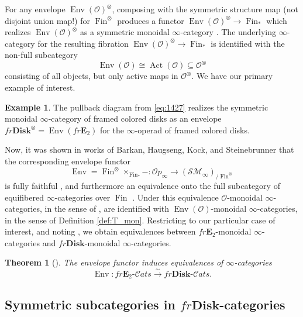 \documentclass[reqno]{amsart}
\newtheorem{theorem}[lemma]{Theorem}
\theoremstyle{definition}
\newtheorem{example}[lemma]{Example}
\newcommand{\msc}[1]{\mathscr{#1}}
\newcommand{\opn}[1]{\operatorname{#1}}
\newcommand{\ot}{\otimes}
\newcommand{\E}{\mathbf{E}}
\newcommand{\Disk}{\mathbf{Disk}}
\newcommand{\SM}{\mathscr{S}\!\!\mathscr{M}}
\DeclareMathOperator{\Fin}{Fin}
\renewcommand{\1}{\mathbf{1}}
\begin{document}
For any envelope $\opn{Env}(\msc{O})^{\ot}$, composing with the symmetric structure map (not disjoint union map!) for $\Fin^{\ot}$ produces a functor $\opn{Env}(\msc{O})^{\ot}\to \Fin_{\ast}$ which realizes $\opn{Env}(\msc{O})^{\ot}$ as a symmetric monoidal $\infty$-category \cite[Corollary 2.2.4.5.]{ha}. The underlying $\infty$-category for the resulting fibration $\opn{Env}(\msc{O})^{\ot}\to \Fin_{\ast}$ is identified with the non-full subcategory
\[
\opn{Env}(\msc{O})\cong\opn{Act}(\msc{O})\subseteq \msc{O}^{\ot}
\]
consisting of all objects, but only active maps in $\msc{O}^{\ot}$. We have our primary example of interest.

\begin{example}
The pullback diagram from \eqref{eq:1427} realizes the symmetric monoidal $\infty$-category of framed colored disks as an envelope $fr\Disk^{\ot}=\opn{Env}(fr\E_2)$ for the $\infty$-operad of framed colored disks.
\end{example}

Now, it was shown in works of Barkan, Haugseng, Kock, and Steinebrunner that the corresponding envelope functor
\[
\opn{Env}=\Fin^{\ot}\times_{\Fin_{\ast}}-:\msc{O}\!p_{\infty}\to (\SM_{\infty})_{/\Fin^{\ot}}
\]
is fully faithful \cite{haugsengkock24}, and furthermore an equivalence onto the full subcategory of equifibered $\infty$-categories over $\Fin$ \cite{barkanetal25}. Under this equivalence $\msc{O}$-monoidal $\infty$-categories, in the sense of \cite{ha}, are identified with $\opn{Env}(\msc{O})$-monoidal $\infty$-categories, in the sense of Definition \ref{def:T_mon}. Restricting to our particular case of interest, and noting \cite[\href{https://kerodon.net/tag/01ZS}{01ZS}]{kerodon}, we obtain equivalences between $fr\E_2$-monoidal $\infty$-categories and $fr\Disk$-monoidal $\infty$-categories.

\begin{theorem}[\cite{haugsengkock24,barkanetal25}]\label{thm:hk}
The envelope functor induces equivalences of $\infty$-categories
\[
\opn{Env}:fr\E_2\text{-}\msc{C}\!ats\overset{\sim}\to fr\Disk\text{-}\msc{C}\!ats.
\]
\end{theorem}


\subsection{Symmetric subcategories in $fr\Disk$-categories}
\label{sect:subcats}
\end{document}
